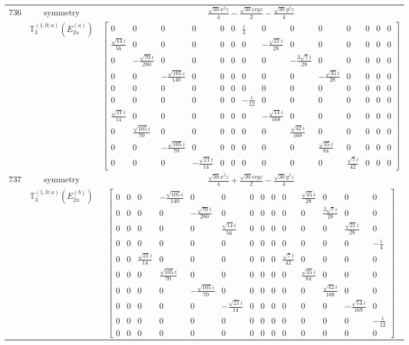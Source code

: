 \documentclass[fleqn,8pt,landscape]{jsarticle}
\begin{document}
\begin{longtable}{ccc}
$ 736 $ & $ \text{symmetry} $ & $ \frac{\sqrt{30} x^{2} z}{4} - \frac{\sqrt{30} i x y z}{2} - \frac{\sqrt{30} y^{2} z}{4} $ \\
$  $ & $ \mathbb{T}_{3}^{(1,0;a)}(E_{2u}^{(a)}) $ & $ \begin{bmatrix} 0 & 0 & 0 & 0 & 0 & 0 & \frac{i}{4} & 0 & 0 & 0 & 0 & 0 & 0 & 0 \\ \frac{\sqrt{14} i}{56} & 0 & 0 & 0 & 0 & 0 & 0 & - \frac{\sqrt{21} i}{28} & 0 & 0 & 0 & 0 & 0 & 0 \\ 0 & - \frac{\sqrt{70} i}{280} & 0 & 0 & 0 & 0 & 0 & 0 & - \frac{3 \sqrt{7} i}{28} & 0 & 0 & 0 & 0 & 0 \\ 0 & 0 & - \frac{\sqrt{105} i}{140} & 0 & 0 & 0 & 0 & 0 & 0 & - \frac{\sqrt{35} i}{28} & 0 & 0 & 0 & 0 \\ 0 & 0 & 0 & 0 & 0 & 0 & 0 & 0 & 0 & 0 & 0 & 0 & 0 & 0 \\ 0 & 0 & 0 & 0 & 0 & 0 & - \frac{i}{12} & 0 & 0 & 0 & 0 & 0 & 0 & 0 \\ \frac{\sqrt{21} i}{14} & 0 & 0 & 0 & 0 & 0 & 0 & - \frac{\sqrt{14} i}{168} & 0 & 0 & 0 & 0 & 0 & 0 \\ 0 & \frac{\sqrt{105} i}{70} & 0 & 0 & 0 & 0 & 0 & 0 & \frac{\sqrt{42} i}{168} & 0 & 0 & 0 & 0 & 0 \\ 0 & 0 & - \frac{\sqrt{105} i}{70} & 0 & 0 & 0 & 0 & 0 & 0 & \frac{\sqrt{35} i}{84} & 0 & 0 & 0 & 0 \\ 0 & 0 & 0 & - \frac{\sqrt{21} i}{14} & 0 & 0 & 0 & 0 & 0 & 0 & \frac{\sqrt{7} i}{42} & 0 & 0 & 0 \end{bmatrix} $ \\ \hline
$ 737 $ & $ \text{symmetry} $ & $ \frac{\sqrt{30} x^{2} z}{4} + \frac{\sqrt{30} i x y z}{2} - \frac{\sqrt{30} y^{2} z}{4} $ \\
$  $ & $ \mathbb{T}_{3}^{(1,0;a)}(E_{2u}^{(b)}) $ & $ \begin{bmatrix} 0 & 0 & 0 & - \frac{\sqrt{105} i}{140} & 0 & 0 & 0 & 0 & 0 & 0 & \frac{\sqrt{35} i}{28} & 0 & 0 & 0 \\ 0 & 0 & 0 & 0 & - \frac{\sqrt{70} i}{280} & 0 & 0 & 0 & 0 & 0 & 0 & \frac{3 \sqrt{7} i}{28} & 0 & 0 \\ 0 & 0 & 0 & 0 & 0 & \frac{\sqrt{14} i}{56} & 0 & 0 & 0 & 0 & 0 & 0 & \frac{\sqrt{21} i}{28} & 0 \\ 0 & 0 & 0 & 0 & 0 & 0 & 0 & 0 & 0 & 0 & 0 & 0 & 0 & - \frac{i}{4} \\ 0 & 0 & \frac{\sqrt{21} i}{14} & 0 & 0 & 0 & 0 & 0 & 0 & \frac{\sqrt{7} i}{42} & 0 & 0 & 0 & 0 \\ 0 & 0 & 0 & \frac{\sqrt{105} i}{70} & 0 & 0 & 0 & 0 & 0 & 0 & \frac{\sqrt{35} i}{84} & 0 & 0 & 0 \\ 0 & 0 & 0 & 0 & - \frac{\sqrt{105} i}{70} & 0 & 0 & 0 & 0 & 0 & 0 & \frac{\sqrt{42} i}{168} & 0 & 0 \\ 0 & 0 & 0 & 0 & 0 & - \frac{\sqrt{21} i}{14} & 0 & 0 & 0 & 0 & 0 & 0 & - \frac{\sqrt{14} i}{168} & 0 \\ 0 & 0 & 0 & 0 & 0 & 0 & 0 & 0 & 0 & 0 & 0 & 0 & 0 & - \frac{i}{12} \\ 0 & 0 & 0 & 0 & 0 & 0 & 0 & 0 & 0 & 0 & 0 & 0 & 0 & 0 \end{bmatrix} $ \\ \hline

\end{longtable}
\end{document}
